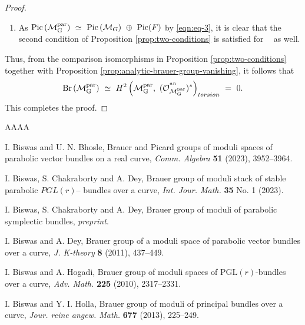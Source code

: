 \documentclass[10pt,reqno]{amsart}
\DeclareMathOperator{\Pic}{\textnormal{Pic}}
\DeclareMathOperator{\Br}{\textnormal{Br}}
\DeclareMathOperator{\mgpar}{\mc{M}_G^{par}}
\newcommand{\mc}[1]{\mathcal{#1}}
\theoremstyle{myroman}
\numberwithin{equation}{section}
\begin{document}
\begin{proof}
\begin{enumerate}[(1)]
				\item As $\Pic\left(\mgpar\right)\ \simeq\ \Pic\left(\mc{M}_G\right)\ \oplus\ \Pic(F)$ by \eqref{eqn:eq-3}, it is clear that the second condition of  Proposition \ref{prop:two-conditions} is satisfied for $\mgpar$ as well. 
			\end{enumerate}
			Thus, from the comparison isomorphisms in Proposition \ref{prop:two-conditions} together with Proposition \ref{prop:analytic-brauer-group-vanishing}, it follows that 
			\begin{align*}
				\Br\left(\mgpar\right)\ \simeq\ H^2\left(\mgpar, \ (\mc{O}^{^{an}}_{\mgpar})^*\right)_{torsion}\ =\ 0.
			\end{align*}
			This completes the proof.
		\end{proof}
		
		\begin{thebibliography}{AAAA} 
			
			
			 I. Biswas and U. N. Bhosle, Brauer and Picard groups of moduli spaces of parabolic vector 
			bundles on a real curve, \textit{Comm. Algebra} \textbf{51} (2023), 3952--3964.
			
			 I. Biswas, S. Chakraborty and A. Dey, Brauer group of moduli stack of stable parabolic 
			$PGL(r)$-- bundles over a curve, \textit{Int. Jour. Math.} \textbf{35} No. 1 (2023).
			
			 I. Biswas, S. Chakraborty and A. Dey, Brauer group of moduli of parabolic symplectic 
			bundles, \textit{preprint}.
			
			 I. Biswas and A. Dey, Brauer group of a moduli space of parabolic 
			vector bundles over a curve, \textit{J. K-theory} {\bf 8} (2011), 437--449.
			
			 I. Biswas and A. Hogadi, Brauer group of moduli spaces of
			$\text{PGL}(r)$-bundles over a curve, \textit{Adv. Math.} {\bf 225} (2010), 2317--2331.
			
			 I. Biswas and Y. I. Holla, Brauer group of moduli of principal bundles
			over a curve, \textit{Jour. reine angew. Math.} \textbf{677} (2013), 225--249.
			

\end{thebibliography}
\end{document}
